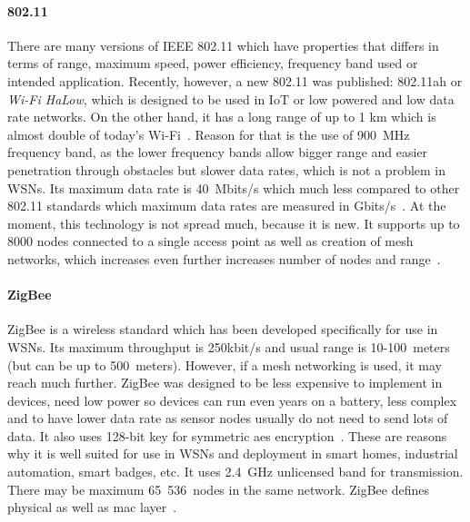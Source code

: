 \paragraph{802.11}
There are many versions of IEEE 802.11 which have properties that differs in terms of range, maximum speed, power efficiency, frequency band used or intended application. Recently, however, a new 802.11 was published\footnotemark: 802.11ah or \textit{Wi-Fi HaLow}, which is designed to be used in IoT or low powered and low data rate networks.
% 
On the other hand, it has a long range of up to 1 km which is almost double of today’s Wi-Fi~\cite{EricZeman2016WiFiInformationWeek}. Reason for that is the use of 900~MHz frequency band, as the lower frequency bands allow bigger range and easier penetration through obstacles but slower data rates, which is not a problem in WSNs. Its maximum data rate is 40~Mbits/s which much less compared to other 802.11 standards which maximum data rates are measured in Gbits/s~\cite{Jean-JacquesDeLisle2015Whats802.11ah}. At the moment, this technology is not spread much, because it is new. It supports up to 8000 nodes connected to a single access point as well as creation of mesh networks, which increases even further increases number of nodes and range~\cite{ClausHetting2017GiantHaLow}.
% 
\paragraph{ZigBee}
ZigBee is a wireless standard which has been developed specifically for use in WSNs. Its maximum throughput is 250kbit/s and usual range is 10-100~meters (but can be up to 500~meters). However, if a mesh networking is used, it may reach much further. ZigBee was designed to be less expensive to implement in devices, need low power so devices can run even years on a battery, less complex and to have lower data rate as sensor nodes usually do not need to send lots of data.
% 
It also uses 128-bit key for symmetric \acrshort{aes} encryption~\cite{PaulLamkin2018Z-WaveHome}. These are reasons why it is well suited for use in WSNs and deployment in smart homes, industrial automation, smart badges, etc. It uses 2.4~GHz unlicensed band for transmission. There may be maximum 65~536~nodes in the same network\footnotemark. ZigBee defines physical as well as \acrshort{mac} layer~\cite{Sohraby2007WirelessApplications}.
% 
